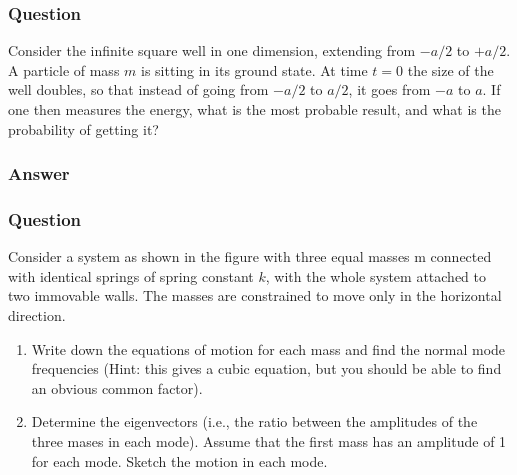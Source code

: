 \subsubsection{Question}
Consider the infinite square well in one dimension, extending from $-a/2$ to $+a/2$. A particle of mass $m$ is sitting in its ground state. At time $t = 0$ the size of the well doubles, so that instead of going from $-a/2$ to $a/2$, it goes from $-a$ to $a$. If one then measures the energy, what is the most probable result, and what is the probability of getting it?

\subsubsection{Answer}


\subsubsection{Question}
Consider a system as shown in the figure with three equal masses m connected with identical springs of spring constant $k$, with the whole system attached to two immovable walls. The masses are constrained to move only in the horizontal direction.
\begin{enumerate}
	\item Write down the equations of motion for each mass and find the normal mode frequencies (Hint: this gives a cubic equation, but you should be able to find an obvious common factor).
	\item Determine the eigenvectors (i.e., the ratio between the amplitudes of the three mases in each mode). Assume that the first mass has an amplitude of 1 for each mode. Sketch the motion in each mode. 
\end{enumerate}
